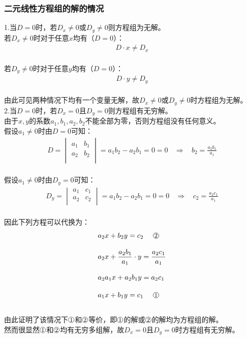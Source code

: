 \documentclass[UTF8]{ctexart}
\newcommand*{\circled}[1]{\lower.7ex\hbox{\tikz\draw (0pt, 0pt)circle (.4em) node {\makebox[0em][c]{\footnotesize #1}};}}
\begin{document}
\subsubsection{二元线性方程组的解的情况}
    \setcounter{equation}{0}
    1.当$D=0$时，若$D_x\neq 0$或$D_y\neq 0$则方程组为无解。\\[3mm]
    若$D_x\neq 0$时对于任意$x$均有（$D=0$）：
    \begin{align}
        D\cdot x\neq D_x
    \end{align}\\
    若$D_y\neq 0$时对于任意$y$均有（$D=0$）：
    \begin{align}
        D\cdot y\neq D_y
    \end{align}\\
    由此可见两种情况下均有一个变量无解，故$D_x\neq 0$或$D_y\neq 0$时方程组为无解。\\[12mm]
    2.当$D=0$时，若$D_x=0$且$D_y=0$则方程组有无穷解。\\[3mm]
    由于$x,y$的系数$a_1,b_1,a_2,b_2$不能全部为零，否则方程组没有任何意义。\\[3mm]
    假设$a_1\neq 0$时由$D=0$可知：
    \begin{align}
        D=
        \begin{vmatrix}
            a_1&b_1\\
            a_2&b_2\\
        \end{vmatrix}=
        a_1b_2-a_2b_1=0=0~~~~\Longrightarrow~~~~b_2=\frac{a_2b_1}{a_1}
    \end{align}\\
    假设$a_1\neq 0$时由$D_y=0$可知：
    \begin{align}
        D_y=
        \begin{vmatrix}
            a_1&c_1\\
            a_2&c_2\\
        \end{vmatrix}=
        a_1b_2-a_2b_1=0=0~~~~\Longrightarrow~~~~c_2=\frac{a_2c_1}{a_1}
    \end{align}\\
    因此下列方程可以代换为：
    \begin{align}
        &a_2x+b_2y=c_2~~~~\circled{2}\\[3mm]
        &a_2x+\frac{a_2b_1}{a_1}\cdot y=\frac{a_2c_1}{a_1}\\[3mm]
        &a_2a_1x+a_2b_1y=a_2c_1\\[3mm]
        &a_1x+b_1y=c_1~~~~\circled{1}
    \end{align}\\
    由此证明了该情况下$\circled{1}$和$\circled{2}$等价，即$\circled{1}$的解或$\circled{2}$的解均为方程组的解。\\[3mm]
    然而很显然$\circled{1}$和$\circled{2}$均有无穷多组解，故$D_x=0$且$D_y=0$时方程组有无穷解。
\end{document}
